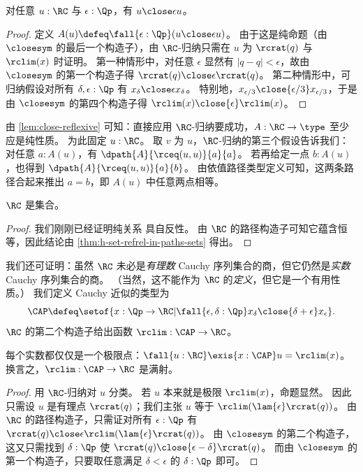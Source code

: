 \begin{lem} \label{lem:close-reflexive}
  对任意 $u:\RC$ 与 $\epsilon:\Qp$，有 $u\close\epsilon u$。
\end{lem}
\begin{proof}
  定义 $A(u) \defeq \fall{\epsilon:\Qp} (u\close\epsilon u)$。
  由于这是纯命题（由 $\closesym$ 的最后一个构造子），由 $\RC$-归纳只需在 $u$ 为 $\rcrat(q)$ 与 $\rclim(x)$ 时证明。
  第一种情形中，对任意 $\epsilon$ 显然有 $|q-q|<\epsilon$，故由 $\closesym$ 的第一个构造子得 $\rcrat(q) \close\epsilon \rcrat(q)$。
  第二种情形中，可归纳假设对所有 $\delta,\epsilon:\Qp$ 有 $x_\delta \close\epsilon x_\delta$。
  特别地，$x_{\epsilon/3} \close{\epsilon/3} x_{\epsilon/3}$，于是由 $\closesym$ 的第四个构造子得 $\rclim(x) \close{\epsilon} \rclim(x)$。
\end{proof}

由 \cref{lem:close-reflexive} 可知：直接应用 $\RC$-归纳要成功，$A:\RC\to\type$ 至少应是纯性质。
为此固定 $u:\RC$。
取 $v$ 为 $u$，$\RC$-归纳的第三个假设告诉我们：对任意 $a : A(u)$，有 $\dpath{A}{\rceq(u,u)}{a}{a}$。
若再给定一点 $b : A(u)$，也得到 $\dpath{A}{\rceq(u,u)}{a}{b}$。
由依值路径类型定义可知，这两条路径合起来推出 $a = b$，即 $A(u)$ 中任意两点相等。

\begin{thm}\label{thm:Cauchy-reals-are-a-set}
  $\RC$ 是集合。
\end{thm}
\begin{proof}
  我们刚刚已经证明纯关系
  具自反性。
  由 $\RC$ 的路径构造子可知它蕴含恒等，因此结论由 \cref{thm:h-set-refrel-in-paths-sets} 得出。
\end{proof}

我们还可证明：虽然 $\RC$ 未必是\emph{有理数} Cauchy 序列集合的商，但它仍然是\emph{实数} Cauchy 序列集合的商。
（当然，这不能作为 $\RC$ 的\emph{定义}，但它是一个有用性质。）
我们定义 Cauchy 近似的类型为
%
%
%
\begin{equation*}
  \CAP \defeq
  \setof{ x : \Qp \to \RC |
    \fall{\epsilon, \delta : \Qp} x_\delta \close{\delta + \epsilon} x_\epsilon
  }.
\end{equation*}
$\RC$ 的第二个构造子给出函数 $\rclim:\CAP\to\RC$。

\begin{lem} \label{RC-lim-onto}
  每个实数都仅仅是一个极限点：$\fall{u : \RC} \exis{x : \CAP} u = \rclim(x)$。
  换言之，$\rclim:\CAP\to\RC$ 是满射。
\end{lem}
\begin{proof}
  用 $\RC$-归纳对 $u$ 分类。
  若 $u$ 本来就是极限 $\rclim(x)$，命题显然。
  因此只需设 $u$ 是有理点 $\rcrat(q)$；我们主张 $u$ 等于 $\rclim(\lam{\epsilon} \rcrat(q))$。
  由 $\RC$ 的路径构造子，只需证对所有 $\epsilon:\Qp$ 有 $\rcrat(q) \close\epsilon \rclim(\lam{\epsilon} \rcrat(q))$。
  由 $\closesym$ 的第二个构造子，这又只需找到 $\delta:\Qp$ 使 $\rcrat(q)\close{\epsilon-\delta} \rcrat(q)$。
  而由 $\closesym$ 的第一个构造子，只要取任意满足 $\delta<\epsilon$ 的 $\delta:\Qp$ 即可。
\end{proof}

